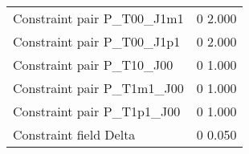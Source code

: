 \documentclass[a4paper,11pt]{article}
\begin{document}
\begin{center}
\begin{tabular}{|ll|}
Constraint pair P\_T00\_J1m1    &0 \phantom{0}2.000   \\
Constraint pair P\_T00\_J1p1    &0 \phantom{0}2.000   \\
Constraint pair P\_T10\_J00     &0 \phantom{0}1.000   \\
Constraint pair P\_T1m1\_J00    &0 \phantom{0}1.000   \\
Constraint pair P\_T1p1\_J00    &0 \phantom{0}1.000   \\
Constraint field Delta          &0 \phantom{0}0.050   \\
\hline
\end{tabular}
\end{center}

%
%
\end{document}
